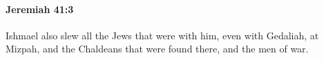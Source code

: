 
		\paragraph{Jeremiah 41:3} %
			\label{JEREMIAH-41-3}

			Ishmael also slew all the Jews that were with him, even with Gedaliah, at Mizpah, and the Chaldeans that were found there, and the men of war.


